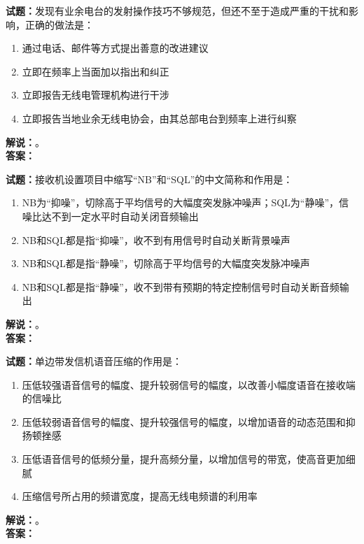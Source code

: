 \documentclass{ctexbook}
\begin{document}
\bigskip




\noindent\textbf{试题：}发现有业余电台的发射操作技巧不够规范，但还不至于造成严重的干扰和影响，正确的做法是：
\begin{enumerate}[leftmargin=3em]
\item 通过电话、邮件等方式提出善意的改进建议
\item 立即在频率上当面加以指出和纠正
\item 立即报告无线电管理机构进行干涉
\item 立即报告当地业余无线电协会，由其总部电台到频率上进行纠察
\end{enumerate}
\noindent\textbf{解说：}\textbf{}。\\\noindent\textbf{答案：}

\bigskip




\noindent\textbf{试题：}接收机设置项目中缩写“NB”和“SQL”的中文简称和作用是：
\begin{enumerate}[leftmargin=3em]
\item NB为“抑噪”，切除高于平均信号的大幅度突发脉冲噪声；SQL为“静噪”，信噪比达不到一定水平时自动关闭音频输出
\item NB和SQL都是指“抑噪”，收不到有用信号时自动关断背景噪声
\item NB和SQL都是指“静噪”，切除高于平均信号的大幅度突发脉冲噪声
\item NB和SQL都是指“静噪”，收不到带有预期的特定控制信号时自动关断音频输出
\end{enumerate}
\noindent\textbf{解说：}\textbf{}。\\\noindent\textbf{答案：}

\bigskip




\noindent\textbf{试题：}单边带发信机语音压缩的作用是：
\begin{enumerate}[leftmargin=3em]
\item 压低较强语音信号的幅度、提升较弱信号的幅度，以改善小幅度语音在接收端的信噪比
\item 压低较弱语音信号的幅度、提升较强信号的幅度，以增加语音的动态范围和抑扬顿挫感
\item 压低语音信号的低频分量，提升高频分量，以增加信号的带宽，使高音更加细腻
\item 压缩信号所占用的频谱宽度，提高无线电频谱的利用率
\end{enumerate}
\noindent\textbf{解说：}\textbf{}。\\\noindent\textbf{答案：}
\end{document}
